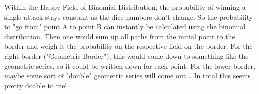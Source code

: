 \documentclass[11pt,a4paper]{article}
\begin{document}
    Within the Happy Field of Binomial Distribution, the probability of winning a single attack stays constant as the dice numbers don't change.
    So the probability to "go from" point A to point B can instantly be calculated using the binomial distribution.
    Then one would sum up all paths from the initial point to the border and weigh it the probability on the respective field on the border.
    For the right border ("Geometric Border"), this would come down to something like the geometric series, so it could be written down for each point.
    For the lower border, maybe some sort of "double" geometric series will come out... In total this seems pretty doable to me!
\end{document}
